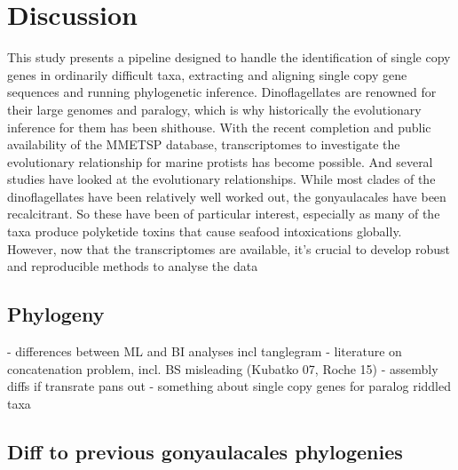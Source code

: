 \documentclass[12pt]{article}
\begin{document}
\section{Discussion}
This study presents a pipeline designed to handle the identification of single copy genes in ordinarily difficult taxa, extracting and aligning single copy gene sequences and running phylogenetic inference. 
Dinoflagellates are renowned for their large genomes and paralogy, which is why historically the evolutionary inference for them has been shithouse. With the recent completion and public availability of the MMETSP database, transcriptomes to investigate the evolutionary relationship for marine protists has become possible. And several studies have looked at the evolutionary relationships. While most clades of the dinoflagellates have been relatively well worked out, the gonyaulacales have been recalcitrant. So these have been of particular interest, especially as many of the taxa produce polyketide toxins that cause seafood intoxications globally. However, now that the transcriptomes are available, it's crucial to develop robust and reproducible methods to analyse the data
\subsection*{Phylogeny}
- differences between ML and BI analyses incl tanglegram
- literature on concatenation problem, incl. BS misleading (Kubatko 07, Roche 15)
- assembly diffs if transrate pans out
- something about single copy genes for paralog riddled taxa

\subsection*{Diff to previous gonyaulacales phylogenies}
\end{document}
